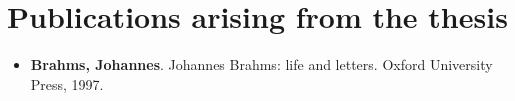 \section*{Publications arising from the thesis}

\begin{itemize}
    \item \textbf{Brahms, Johannes}. Johannes Brahms: life and letters. Oxford University Press, 1997.
\end{itemize}
